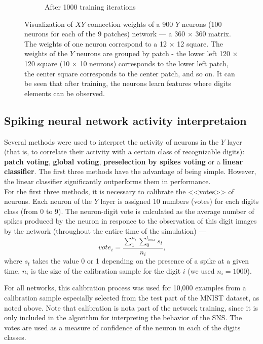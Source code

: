 \documentclass[a4paper]{article}
\begin{document}
\begin{figure}
\begin{subfigure}{0.45\textwidth}
    \caption{After 1000 training iterations}
\end{subfigure}
\caption{Visualization of $XY$ connection weights of a 900 $Y$ neurons (100 neurons for each of the 9 patches) network --- a 360 $ \times $ 360 matrix. The weights of one neuron correspond to a 12 $\times$ 12 square. The weights of the $Y$ neurons are grouped by patch - the lower left 120 $  \times $ 120 square  (10 $ \times $ 10 neurons) corresponds to the lower left patch, the center square corresponds to the center patch, and so on. It can be seen that after training, the neurons learn features where digits elements can be observed.}
\end{figure}

\subsection{Spiking neural network activity interpretaion}

Several methods were used to interpret the activity of neurons in the $Y$ layer (that is, to correlate their activity with a certain class of recognizable digits): \textbf{patch voting}, \textbf{global voting}, \textbf{preselection by spikes voting} or a \textbf{linear classifier}. The first three methods have the advantage of being simple. However, the linear classifier significantly outperforms them in performance. \\

For the first three methods, it is necessary to calibrate the <<votes>> of neurons. Each neuron of the $Y$ layer is assigned 10 numbers (votes) for each digits class (from 0 to 9). The neuron-digit vote is calculated as the average number of spikes produced by the neuron in responce to the observation of this digit images by the network (throughout the entire time of the simulation) ---
$$ vote_i = \frac{\sum_ {1}^{n_{i}}{\sum_{0}^{t_{max}} s_t}} {n_{i}} \text {,} $$
where $ s_t $ takes the value 0 or 1 depending on the presence of a spike at a given time, $ n_i $ is the size of the calibration sample for the digit $ i $ (we used $ n_i = 1000 $).

For all networks, this calibration process was used for 10,000 examples from a calibration sample especially selected from the test part of the MNIST dataset, as noted above. Note that calibration is nota  part of the network training, since it is only included in the algorithm for interpreting the behavior of the SNS. The votes are used as a measure of confidence of the neuron in each of the digits classes.
\end{document}
